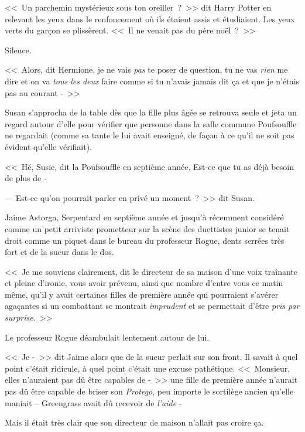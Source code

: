 \later

<<~Un parchemin mystérieux sous ton oreiller~?~>> dit Harry Potter en relevant les yeux dans le renfoncement où ils étaient assis et étudiaient. Les yeux verts du garçon se plissèrent. <<~Il ne venait pas du père noël~?~>>

Silence.

<<~Alors, dit Hermione, je ne vais \emph{pas} te poser de question, tu ne vas \emph{rien} me dire et on va \emph{tous les deux} faire comme si tu n'avais jamais dit ça et que je n'étais pas au courant -~>>

\later

Susan s'approcha de la table dès que la fille plus âgée se retrouva seule et jeta un regard autour d'elle pour vérifier que personne dans la salle commune Poufsouffle ne regardait (comme sa tante le lui avait enseigné, de façon à ce qu'il ne soit pas évident qu'elle vérifiait).

<<~Hé, Susie, dit la Poufsouffle en septième année. Est-ce que tu as déjà besoin de plus de -

--- Est-ce qu'on pourrait parler en privé un moment~?~>> dit Susan.

\later

Jaime Astorga, Serpentard en septième année et jusqu'à récemment considéré comme un petit arriviste prometteur sur la scène des duettistes junior se tenait droit comme un piquet dans le bureau du professeur Rogue, dents serrées très fort et de la sueur dans le dos.

<<~Je me souviens clairement, dit le directeur de sa maison d'une voix traînante et pleine d'ironie, vous avoir prévenu, ainsi que nombre d'entre vous ce matin même, qu'il y avait certaines filles de première année qui pourraient s'avérer agaçantes si un combattant se montrait \emph{imprudent} et se permettait d'être \emph{pris par surprise}.~>>

Le professeur Rogue déambulait lentement autour de lui.

<<~Je -~>> dit Jaime alors que de la sueur perlait sur son front. Il savait à quel point c'était ridicule, à quel point c'était une excuse pathétique. <<~Monsieur, elles n'auraient pas dû être capables de -~>> une fille de première année n'aurait pas dû être capable de briser son \emph{Protego}, peu importe le sortilège ancien qu'elle maniait -- Greengrass avait dû recevoir de \emph{l'aide} -

Mais il était très clair que son directeur de maison n'allait pas croire ça.

